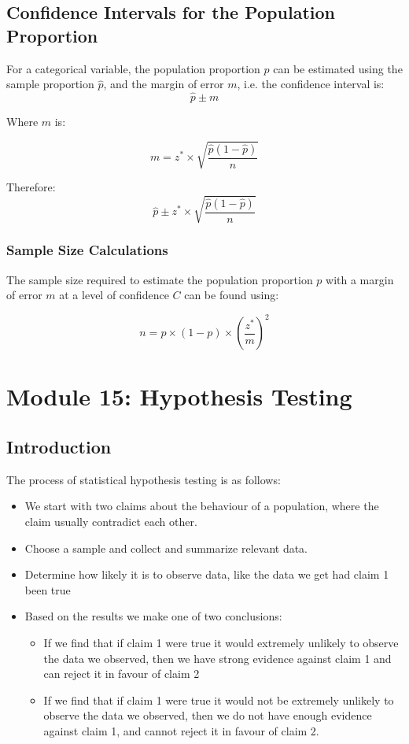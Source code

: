 \documentclass[12pt letter]{report}
\begin{document}
\section{Confidence Intervals for the Population Proportion}

For a categorical variable, the population proportion $p$ can be estimated using the sample proportion $\hat{p}$, and the
margin of error $m$, i.e. the confidence interval is:
\[
  \hat{p} \pm m
\]

Where $m$ is:

\[
  m = z^* \times \sqrt{\frac{\hat{p}(1-\hat{p})}{n}}
\]

Therefore:
\[
  \hat{p} \pm z^* \times \sqrt{\frac{\hat{p}\left( 1 - \hat{p} \right) }{n}}
\]

\subsection{Sample Size Calculations}

The sample size required to estimate the population proportion $p$ with a margin of error $m$ at a level of confidence
$C$ can be found using:

\[
  n = p \times \left( 1 - p \right) \times \left( \frac{z^*}{m} \right)^2
\]

\chapter{Module 15: Hypothesis Testing}

\section{Introduction}


The process of statistical hypothesis testing is as follows:
\begin{itemize}
  \item We start with two claims about the behaviour of a population, where the claim usually contradict each other.
  \item Choose a sample and collect and summarize relevant data.
  \item Determine how likely it is to observe data, like the data we get had claim 1 been true
  \item Based on the results we make one of two conclusions:
        \begin{itemize}
          \item If we find that if claim 1 were true it would extremely unlikely to observe the data we observed, then we
                have strong evidence against claim 1 and can reject it in favour of claim 2
          \item If we find that if claim 1 were true it would not be extremely unlikely to observe the data we observed,
                then we do not have enough evidence against claim 1, and cannot reject it in favour of claim 2.
        \end{itemize}
\end{itemize}
\end{document}
